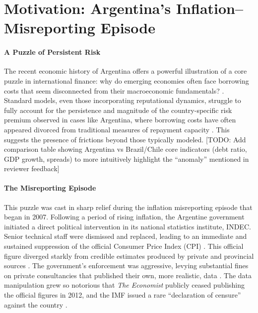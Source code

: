 \documentclass[12pt]{article}
\theoremstyle{plain}
\begin{document}
\section{Motivation: Argentina's Inflation--Misreporting Episode}
\label{sec:motivation}

\paragraph{A Puzzle of Persistent Risk}
The recent economic history of Argentina offers a powerful illustration of a
core puzzle in international finance: why do emerging economies often face
borrowing costs that seem disconnected from their macroeconomic fundamentals?
\citep{TomzWright2013, MeyerReinhartTrebesch2022}. Standard models, even those
incorporating reputational dynamics, struggle to fully account for the
persistence and magnitude of the country-specific risk premium observed in
cases like Argentina, where borrowing costs have often appeared divorced from
traditional measures of repayment capacity \citep{MorelliMoretti2023}. This
suggests the presence of frictions beyond those typically modeled.
	{\color{red}[TODO: Add comparison table showing Argentina vs Brazil/Chile core
			indicators (debt ratio, GDP growth, spreads) to more intuitively highlight the
			``anomaly'' mentioned in reviewer feedback]}

\paragraph{The Misreporting Episode}
This puzzle was cast in sharp relief during the inflation misreporting episode
that began in 2007. Following a period of rising inflation, the Argentine
government initiated a direct political intervention in its national statistics
institute, INDEC. Senior technical staff were dismissed and replaced, leading
to an immediate and sustained suppression of the official Consumer Price Index
(CPI) \citep{MorelliMoretti2023}. This official figure diverged starkly from
credible estimates produced by private and provincial sources
\citep{Cavallo2013}. The government's enforcement was aggressive, levying
substantial fines on private consultancies that published their own, more
realistic, data \citep{ReutersFines2013}. The data manipulation grew so
notorious that \textit{The Economist} publicly ceased publishing the official
figures in 2012, and the IMF issued a rare ``declaration of censure'' against
the country \citep{Economist2012, IMFPress2013}.
\end{document}
